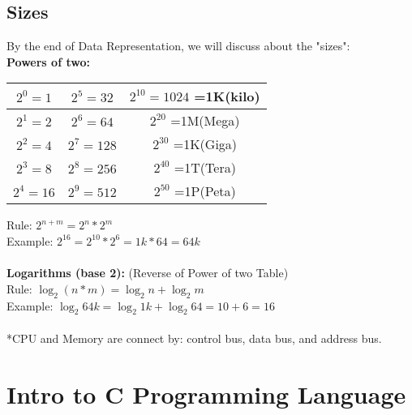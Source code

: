 \documentclass{article}
\begin{document}
\subsection{Sizes}
By the end of Data Representation, we will discuss about the "sizes":\\
\textbf{Powers of two:}
\begin{center}
    \begin{tabular}{|c|c|c|}
    \hline
       $2^0 =1$  & $2^5=32$ & $2^{10} = 1024$ =1K(kilo)  \\
         \hline
       $2^1 =2$  & $2^6=64$ & $2^{20}$ =1M(Mega)  \\
         \hline
       $2^2 =4$  & $2^7=128$ & $2^{30}$ =1K(Giga)  \\
         \hline
       $2^3 =8$  & $2^8=256$ & $2^{40}$ =1T(Tera)  \\
         \hline
       $2^4 =16$  & $2^9=512$ & $2^{50}$ =1P(Peta)  \\
    \hline
    \end{tabular}
\end{center}
Rule: $2^{n+m} = 2^{n} * 2^{m}$\\
Example: $2^{16} = 2^{10} * 2^{6} = 1k * 64 = 64k$\\
  \\
\textbf{Logarithms (base 2):}
(Reverse of Power of two Table)\\
Rule: $\log_{2}(n*m) = \log_{2}n + \log_{2}m$\\
Example: $\log_{2}64k = \log_{2}1k + \log_{2}64 = 10+6 = 16$\\
  \\
*CPU and Memory are connect by: control bus, data bus, and address bus.
\newpage

\section{Intro to C Programming Language}
\end{document}
